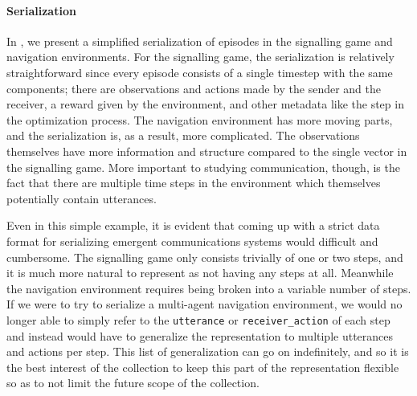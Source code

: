 \paragraph{Serialization}
In , we present a simplified serialization of episodes in the signalling game and navigation environments.
For the signalling game, the serialization is relatively straightforward since every episode consists of a single timestep with the same components;
  there are observations and actions made by the sender and the receiver, a reward given by the environment, and other metadata like the step in the optimization process.
The navigation environment has more moving parts, and the serialization is, as a result, more complicated.
The observations themselves have more information and structure compared to the single vector in the signalling game.
More important to studying communication, though, is the fact that there are multiple time steps in the environment which themselves potentially contain utterances.

Even in this simple example, it is evident that coming up with a strict data format for serializing emergent communications systems would difficult and cumbersome.
The signalling game only consists trivially of one or two steps, and it is much more natural to represent as not having any steps at all.
Meanwhile the navigation environment requires being broken into a variable number of steps.
If we were to try to serialize a multi-agent navigation environment, we would no longer able to simply refer to the {\small\texttt{utterance}} or {\small\texttt{receiver\_action}} of each step and instead would have to generalize the representation to multiple utterances and actions per step.
This list of generalization can go on indefinitely, and so it is the best interest of the collection to keep this part of the representation flexible so as to not limit the future scope of the collection.


